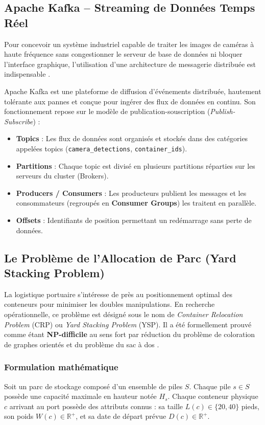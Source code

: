 \documentclass[12pt,a4paper]{article}
\begin{document}
\subsection{Apache Kafka -- Streaming de Données Temps Réel}

Pour concevoir un système industriel capable de traiter les images de caméras à haute fréquence sans congestionner le serveur de base de données ni bloquer l'interface graphique, l'utilisation d'une architecture de messagerie distribuée est indispensable \cite{Kafka}.

Apache Kafka est une plateforme de diffusion d'événements distribuée, hautement tolérante aux pannes et conçue pour ingérer des flux de données en continu. Son fonctionnement repose sur le modèle de publication-souscription (\textit{Publish-Subscribe}) :
\begin{itemize}
  \item \textbf{Topics} : Les flux de données sont organisés et stockés dans des catégories appelées topics (\texttt{camera\_detections}, \texttt{container\_ids}).
  \item \textbf{Partitions} : Chaque topic est divisé en plusieurs partitions réparties sur les serveurs du cluster (Brokers).
  \item \textbf{Producers / Consumers} : Les producteurs publient les messages et les consommateurs (regroupés en \textbf{Consumer Groups}) les traitent en parallèle.
  \item \textbf{Offsets} : Identifiants de position permettant un redémarrage sans perte de données.
\end{itemize}

\subsection{Le Problème de l'Allocation de Parc (Yard Stacking Problem)}

La logistique portuaire s'intéresse de près au positionnement optimal des conteneurs pour minimiser les doubles manipulations. En recherche opérationnelle, ce problème est désigné sous le nom de \textit{Container Relocation Problem} (CRP) ou \textit{Yard Stacking Problem} (YSP). Il a été formellement prouvé comme étant \textbf{NP-difficile} au sens fort par réduction du problème de coloration de graphes orientés et du problème du sac à dos \cite{Caserta2011, Kim2002, Jin2015}.

\subsubsection{Formulation mathématique}
Soit un parc de stockage composé d'un ensemble de piles $S$. Chaque pile $s \in S$ possède une capacité maximale en hauteur notée $H_s$.
Chaque conteneur physique $c$ arrivant au port possède des attributs connus : sa taille $L(c) \in \{20, 40\}$ pieds, son poids $W(c) \in \mathbb{R}^+$, et sa date de départ prévue $D(c) \in \mathbb{R}^+$.
\end{document}
